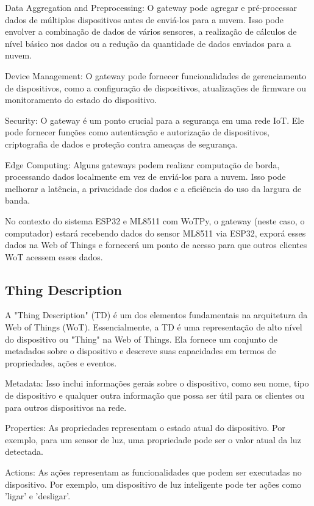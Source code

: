 Data Aggregation and Preprocessing: O gateway pode agregar e pré-processar dados de múltiplos dispositivos antes de enviá-los para a nuvem. Isso pode envolver a combinação de dados de vários sensores, a realização de cálculos de nível básico nos dados ou a redução da quantidade de dados enviados para a nuvem.

Device Management: O gateway pode fornecer funcionalidades de gerenciamento de dispositivos, como a configuração de dispositivos, atualizações de firmware ou monitoramento do estado do dispositivo.

Security: O gateway é um ponto crucial para a segurança em uma rede IoT. Ele pode fornecer funções como autenticação e autorização de dispositivos, criptografia de dados e proteção contra ameaças de segurança.

Edge Computing: Alguns gateways podem realizar computação de borda, processando dados localmente em vez de enviá-los para a nuvem. Isso pode melhorar a latência, a privacidade dos dados e a eficiência do uso da largura de banda.

No contexto do sistema ESP32 e ML8511 com WoTPy, o gateway (neste caso, o computador) estará recebendo dados do sensor ML8511 via ESP32, exporá esses dados na Web of Things e fornecerá um ponto de acesso para que outros clientes WoT acessem esses dados.

\subsection{Thing Description}

A "Thing Description" (TD) é um dos elementos fundamentais na arquitetura da Web of Things (WoT). Essencialmente, a TD é uma representação de alto nível do dispositivo ou "Thing" na Web of Things. Ela fornece um conjunto de metadados sobre o dispositivo e descreve suas capacidades em termos de propriedades, ações e eventos.

Metadata: Isso inclui informações gerais sobre o dispositivo, como seu nome, tipo de dispositivo e qualquer outra informação que possa ser útil para os clientes ou para outros dispositivos na rede.

Properties: As propriedades representam o estado atual do dispositivo. Por exemplo, para um sensor de luz, uma propriedade pode ser o valor atual da luz detectada.

Actions: As ações representam as funcionalidades que podem ser executadas no dispositivo. Por exemplo, um dispositivo de luz inteligente pode ter ações como 'ligar' e 'desligar'.

